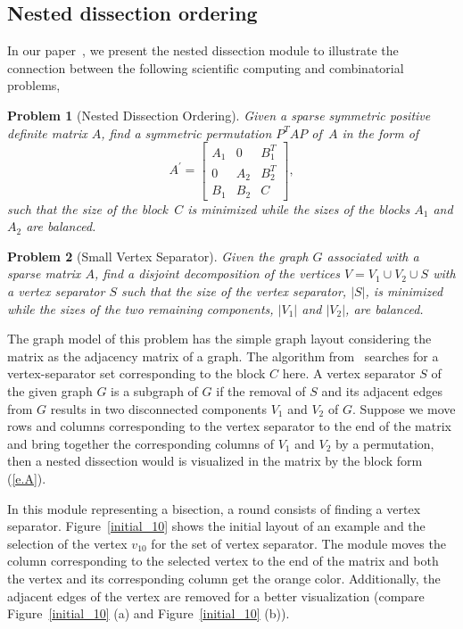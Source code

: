 \documentclass[12pt, twoside,a4paper,toc=bibliography]{scrbook}
\newtheorem{problem}{Problem}
\newcommand{\figref}[1]{Figure~\protect\ref{#1}}
\begin{document}
\subsection{Nested dissection ordering}
In our paper~\cite{2014:02}, we present the nested dissection module to
illustrate the connection between the following scientific computing and combinatorial problems,
\begin{problem}[Nested Dissection Ordering]
\label{p.nest.dissect}
Given a sparse symmetric positive
definite matrix $A$, find a symmetric permutation $P^T A P$ of~$A$ in the form of
\begin{equation}
\label{e.A}
A^{\prime} =
\begin{bmatrix}
A_1 & 0   & B_1^T \\[0.2em]
0   & A_2 & B_2^T \\[0.2em]
B_1 & B_2 & C
\end{bmatrix} ,
\end{equation}
such that the size of the block~$C$ is minimized while the sizes of the blocks $A_1$ and $A_2$ are
balanced.

\end{problem}
\begin{problem}[Small Vertex Separator]
\label{p.small.ver.sep} Given the graph $G$ associated with a sparse
matrix $A$, find a disjoint decomposition of the vertices $V = V_1 \cup V_2 \cup S$ with a vertex
separator $S$ such that the size of the vertex separator, $|S|$, is minimized while the sizes of
the two remaining components, $|V_1|$ and $|V_2|$, are balanced.
\end{problem}

The graph model of this problem has the simple graph layout considering the matrix
as the adjacency matrix of a graph.
The algorithm from~\cite{2014:02} searches for a vertex-separator set
corresponding to the block $C$ here. A vertex separator $S$ of the given graph $G$
is a subgraph of $G$ if the removal of $S$ and its adjacent edges from $G$ results in two
disconnected components $V_1$ and $V_2$ of $G$.
Suppose we move rows and columns corresponding to the vertex separator to the end of
the matrix and bring together
the corresponding columns of $V_1$ and $V_2$ by a permutation,
then a nested dissection would is visualized in the matrix by the block form (\ref{e.A}).

In this module representing a bisection, a round consists of finding a vertex separator.
Figure~\ref{initial_10} shows the initial layout of an example
and the selection of the vertex $v_{10}$ for the set of vertex separator.
The module moves the
column corresponding to the selected vertex to the end of the matrix
and both the vertex and its corresponding column get the orange color.
Additionally, the adjacent edges of the vertex are removed for a better visualization
(compare \figref{initial_10} (a) and \figref{initial_10} (b)).
\end{document}
